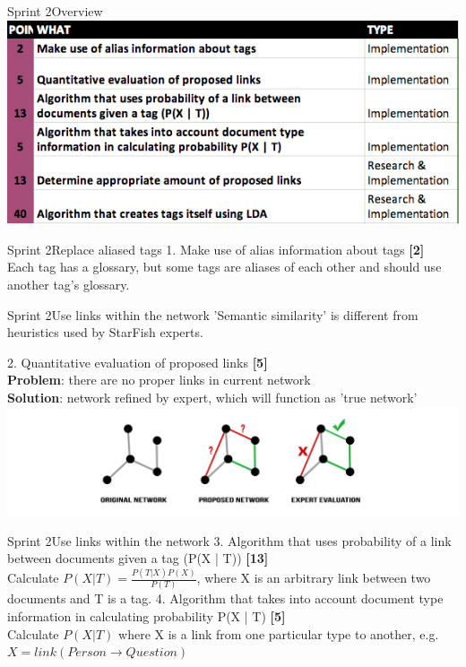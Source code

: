\begin{frame}{Sprint 2}{Overview}
\includegraphics[width=\linewidth]{sprint.jpg}
\end{frame}

\begin{frame}{Sprint 2}{Replace aliased tags}
{\large 1. Make use of alias information about tags {\bf [2]}\\}
Each tag has a glossary, but some tags are aliases of each other and should use another tag's glossary. 
\end{frame}

\begin{frame}{Sprint 2}{Use links within the network }
{\large 'Semantic similarity' is different from heuristics used by StarFish experts.}\newline

{\large 2. Quantitative evaluation of proposed links {\bf [5]}\\}
{\bf Problem}: there are no proper links in current network\\
{\bf Solution}: network refined by expert, which will function as 'true network'
\center
\includegraphics[width=\linewidth]{networks.jpg}
\end{frame}

\begin{frame}{Sprint 2}{Use links within the network }
{\large 3. Algorithm that uses probability of a link between documents given a tag (P(X | T)) {\bf [13]}}\\
Calculate $P(X | T) = \frac{P(T |X)P(X)}{P(T)}$, where X is an arbitrary link between two documents and T is a tag. \newline \newline
{\large 4. Algorithm that takes into account document type information in calculating probability P(X | T) {\bf[5]}}\\
Calculate $P(X | T)$ where X is a link from one particular type to another, e.g. $X = link(Person \rightarrow Question)$
\end{frame}

